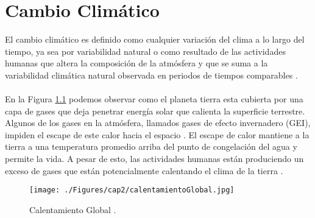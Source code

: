 \newpage{\ } 
\thispagestyle{empty} 

\chapter{Cambio Clim\'atico}


El cambio clim\'atico es definido como cualquier variaci\'on del clima a lo largo del tiempo, ya sea por variabilidad natural o como resultado de las actividades humanas que altera la composici\'on de la atm\'osfera y que se suma a la variabilidad clim\'atica natural observada en periodos de tiempos comparables \cite{robert2002captura}.\\~\\
En la Figura \ref{fig:cambioClimatico} podemos observar como el planeta tierra esta cubierta por una capa de gases que deja penetrar energ\'ia solar que calienta la superficie terrestre. Algunos de los gases en la atm\'osfera, llamados gases de efecto invernadero (GEI), impiden el escape de este calor hacia el espacio . El escape de calor  mantiene a la tierra a una temperatura promedio arriba del punto de congelaci\'on del agua y permite la vida. A pesar de esto, las actividades humanas est\'an produciendo un exceso de gases que est\'an potencialmente calentando el clima de la tierra \cite{almando2014estimacion}.
    \begin{figure}[!hbtp]
    	\centering
    	\texttt{[image: ./Figures/cap2/calentamientoGlobal.jpg]}
    	\caption{Calentamiento Global \cite{calent2015global}.}
    	\label{fig:cambioClimatico}
    \end{figure}


